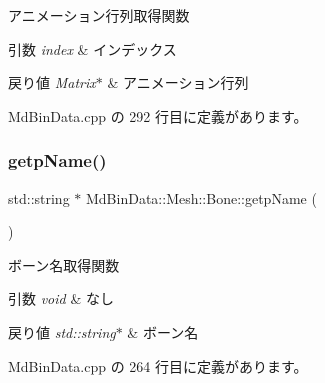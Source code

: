 アニメーション行列取得関数 


\begin{DoxyParams}{引数}
{\em index} & インデックス \\
\hline
\end{DoxyParams}

\begin{DoxyRetVals}{戻り値}
{\em Matrix$\ast$} & アニメーション行列 \\
\hline
\end{DoxyRetVals}


 Md\+Bin\+Data.\+cpp の 292 行目に定義があります。

\mbox{\label{class_md_bin_data_1_1_mesh_1_1_bone_a7a132ac01755ee4a6bca3c25ad3da42c}} 
\subsubsection{\texorpdfstring{getp\+Name()}{getpName()}}
{\footnotesize\ttfamily std\+::string $\ast$ Md\+Bin\+Data\+::\+Mesh\+::\+Bone\+::getp\+Name (\begin{DoxyParamCaption}{ }\end{DoxyParamCaption})}



ボーン名取得関数 


\begin{DoxyParams}{引数}
{\em void} & なし \\
\hline
\end{DoxyParams}

\begin{DoxyRetVals}{戻り値}
{\em std\+::string$\ast$} & ボーン名 \\
\hline
\end{DoxyRetVals}


 Md\+Bin\+Data.\+cpp の 264 行目に定義があります。

\mbox{\label{class_md_bin_data_1_1_mesh_1_1_bone_a0e5d6012c7efa481bbb40cc86b8a0856}} 
